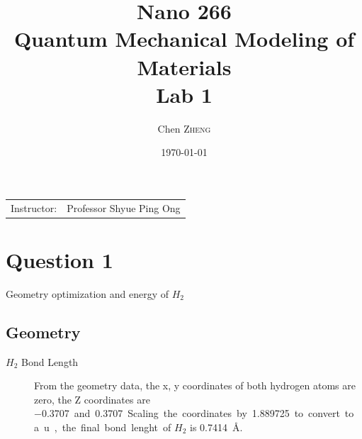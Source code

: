 \documentclass{article}
\title{Nano 266 \\ Quantum Mechanical Modeling of Materials \\ Lab 1} %
\author{Chen \textsc{Zheng}} %
\date{\today} %
\begin{document}
\maketitle %

\begin{center}
\begin{tabular}{l r}
Instructor: & Professor Shyue Ping Ong %
\end{tabular}
\end{center}



\section{Question 1}

Geometry optimization and energy of $H_{2}$


\subsection{Geometry}
\begin{description}
\item[$H_{2}$ Bond Length]
From the geometry data, the x, y coordinates of both hydrogen atoms are zero, the Z coordinates are \SI{-0.3707} and \SI{0.3707}. Scaling the coordinates by \SI{1.889725} to convert to a.u., the final bond lenght of $H_{2}$ is \SI{0.7414}{\angstrom}. 
\end{description} 
\end{document}
